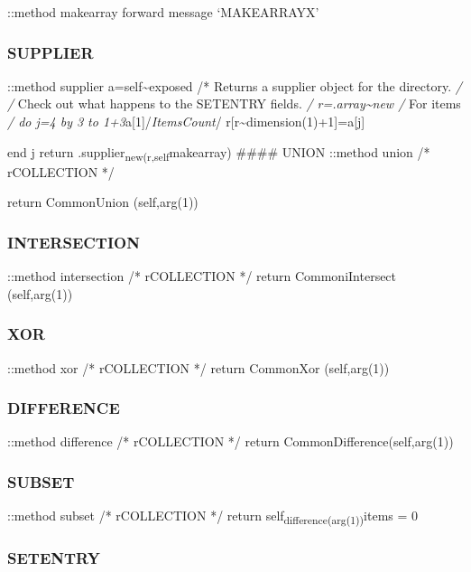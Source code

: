 ::method makearray forward message `MAKEARRAYX'

\hypertarget{supplier-2}{%
\subsubsection{SUPPLIER}\label{supplier-2}}

::method supplier a=self\textasciitilde exposed /* Returns a supplier
object for the directory. \emph{/ /} Check out what happens to the
SETENTRY fields. \emph{/ r=.array\textasciitilde new /} For items
\emph{/ do j=4 by 3 to 1+3}a{[}1{]}/\emph{ItemsCount}/
r{[}r\textasciitilde dimension(1)+1{]}=a{[}j{]}

end j return .supplier\textsubscript{new(r,self}makearray) \#\#\#\#
UNION ::method union /* rCOLLECTION */

return CommonUnion (self,arg(1))

\hypertarget{intersection-4}{%
\subsubsection{INTERSECTION}\label{intersection-4}}

::method intersection /* rCOLLECTION */ return CommoniIntersect
(self,arg(1))

\hypertarget{xor-4}{%
\subsubsection{XOR}\label{xor-4}}

::method xor /* rCOLLECTION */ return CommonXor (self,arg(1))

\hypertarget{difference-4}{%
\subsubsection{DIFFERENCE}\label{difference-4}}

::method difference /* rCOLLECTION */ return
CommonDifference(self,arg(1))

\hypertarget{subset-2}{%
\subsubsection{SUBSET}\label{subset-2}}

::method subset /* rCOLLECTION */ return
self\textsubscript{difference(arg(1))}items = 0

\hypertarget{setentry}{%
\subsubsection{SETENTRY}\label{setentry}}

